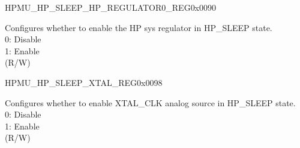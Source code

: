     \begin{register}{H}{PMU\_HP\_SLEEP\_HP\_REGULATOR0\_REG}{0x0090}\label{regdesc:PMUHPSLEEPHPREGULATOR0REG}
    \regnewline%
    \begin{regdesc}\begin{reglist}
    \label{fielddesc:PMUHPSLEEPHPREGULATORXPD}\item [PMU\_HP\_SLEEP\_HP\_REGULATOR\_XPD] Configures whether to enable the HP sys regulator in HP\_SLEEP state.\\ 
0: Disable \\
1: Enable \\
(R/W)
    \end{reglist}\end{regdesc}
    \end{register}


    \begin{register}{H}{PMU\_HP\_SLEEP\_XTAL\_REG}{0x0098}\label{regdesc:PMUHPSLEEPXTALREG}
    \regnewline%
    \begin{regdesc}\begin{reglist}
    \label{fielddesc:PMUHPSLEEPXPDXTAL}\item [PMU\_HP\_SLEEP\_XPD\_XTAL] Configures whether to enable XTAL\_CLK analog source in HP\_SLEEP state.\\ 
0: Disable\\
1: Enable\\
(R/W)
    \end{reglist}\end{regdesc}
    \end{register}



